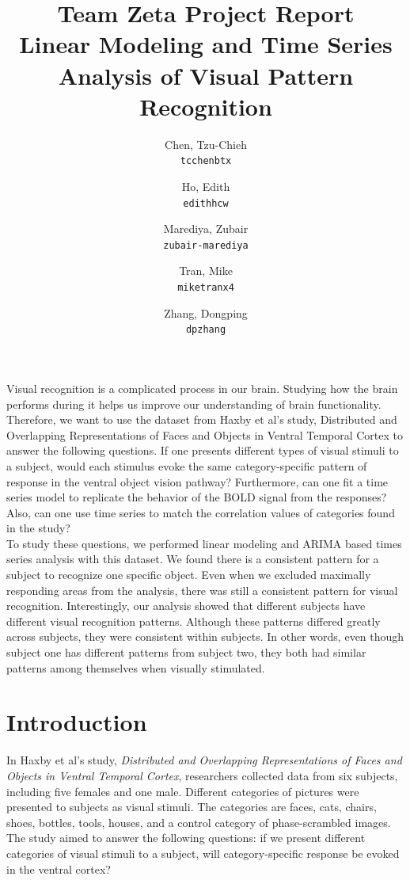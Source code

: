 \documentclass[11pt,twocolumn]{article}
\title{\textbf{Team Zeta Project Report}\\
Linear Modeling and Time Series Analysis of Visual Pattern Recognition}
\author{
  Chen, Tzu-Chieh\\
  \texttt{tcchenbtx}
  \and
  Ho, Edith\\
  \texttt{edithhcw}
  \and
  Marediya, Zubair\\
  \texttt{zubair-marediya}
  \and
  Tran, Mike\\
  \texttt{miketranx4}
  \and
  Zhang, Dongping\\
  \texttt{dpzhang}
}
\begin{document}
\maketitle

\abstract{}
Visual recognition is a complicated process in our brain. 
Studying how the brain performs during it helps us improve our 
understanding of brain functionality. Therefore, we want to use the dataset 
from Haxby et al’s study, Distributed and Overlapping Representations of 
Faces and Objects in Ventral Temporal Cortex to answer the following questions.
If one presents different types of visual stimuli to a subject, would 
each stimulus evoke the same category-specific pattern of response in 
the ventral object vision pathway? Furthermore, can one fit a time series 
model to replicate the behavior of the BOLD signal from the responses? 
Also, can one use time series to match the correlation values of 
categories found in the study? \\

To study these questions, we performed linear modeling and ARIMA based 
times series analysis with this dataset. We found there is a consistent 
pattern for a subject to recognize one specific object. 
Even when we excluded maximally responding areas from the analysis, 
there was still a consistent pattern for visual recognition. Interestingly, 
our analysis showed that different subjects have different visual recognition 
patterns. Although these patterns differed greatly across subjects, 
they were consistent within subjects. In other words, even though subject
one has different patterns from subject two, they both had similar patterns 
among themselves when visually stimulated.\\

\section{Introduction}

In Haxby et al's study, \emph{Distributed and Overlapping Representations of 
Faces and Objects in Ventral Temporal Cortex}\cite{objectrec}, researchers
collected data from six subjects, including five females and one male. 
Different categories of pictures were presented to subjects as visual stimuli.
The categories are faces, cats, chairs, shoes, bottles, tools, houses, 
and a control category of phase-scrambled images.
The study aimed to answer the following questions: if we present 
different categories of visual stimuli to a subject, will category-specific 
response be evoked in the ventral cortex? \\
\end{document}
